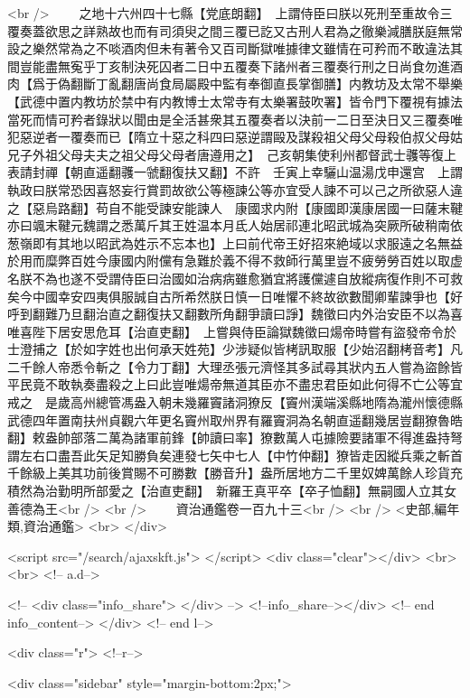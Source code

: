 <br />
　　之地十六州四十七縣【党底朗翻】　上謂侍臣曰朕以死刑至重故令三覆奏蓋欲思之詳熟故也而有司須臾之間三覆已訖又古刑人君為之徹樂減膳朕庭無常設之樂然常為之不啖酒肉但未有著令又百司斷獄唯據律文雖情在可矜而不敢違法其間豈能盡無寃乎丁亥制決死囚者二日中五覆奏下諸州者三覆奏行刑之日尚食勿進酒肉【爲于偽翻斷丁亂翻唐尚食局屬殿中監有奉御直長掌御膳】内教坊及太常不舉樂【武德中置内教坊於禁中有内教博士太常寺有太樂署鼓吹署】皆令門下覆視有據法當死而情可矜者錄狀以聞由是全活甚衆其五覆奏者以決前一二日至決日又三覆奏唯犯惡逆者一覆奏而已【隋立十惡之科四曰惡逆謂毆及謀殺祖父母父母殺伯叔父母姑兄子外祖父母夫夫之祖父母父母者唐遵用之】　己亥朝集使利州都督武士彠等復上表請封禪【朝直遥翻彠一虢翻復扶又翻】不許　壬寅上幸驪山温湯戊申還宫　上謂執政曰朕常恐因喜怒妄行賞罰故欲公等極諫公等亦宜受人諫不可以己之所欲惡人違之【惡烏路翻】苟自不能受諫安能諫人　康國求内附【康國即漢康居國一曰薩末鞬亦曰颯末鞬元魏謂之悉萬斤其王姓温本月氐人始居祁連北昭武城為突厥所破稍南依葱嶺即有其地以昭武為姓示不忘本也】上曰前代帝王好招來絶域以求服遠之名無益於用而糜弊百姓今康國内附儻有急難於義不得不救師行萬里豈不疲勞勞百姓以取虚名朕不為也遂不受謂侍臣曰治國如治病病雖愈猶宜將護儻遽自放縱病復作則不可救矣今中國幸安四夷俱服誠自古所希然朕日慎一日唯懼不終故欲數聞卿輩諫爭也【好呼到翻難乃旦翻治直之翻復扶又翻數所角翻爭讀曰諍】魏徵曰内外治安臣不以為喜唯喜陛下居安思危耳【治直吏翻】　上嘗與侍臣論獄魏徵曰煬帝時嘗有盜發帝令於士澄捕之【於如字姓也出何承天姓苑】少涉疑似皆栲訊取服【少始沼翻栲音考】凡二千餘人帝悉令斬之【令力丁翻】大理丞張元濟怪其多試尋其狀内五人嘗為盜餘皆平民竟不敢執奏盡殺之上曰此豈唯煬帝無道其臣亦不盡忠君臣如此何得不亡公等宜戒之　是歲高州總管馮盎入朝未幾羅竇諸洞獠反【竇州漢端溪縣地隋為瀧州懷德縣武德四年置南扶州貞觀六年更名竇州取州界有羅竇洞為名朝直遥翻幾居豈翻獠魯皓翻】敕盎帥部落二萬為諸軍前鋒【帥讀曰率】獠數萬人屯據險要諸軍不得進盎持弩謂左右口盡吾此矢足知勝負矣連發七矢中七人【中竹仲翻】獠皆走因縱兵乘之斬首千餘級上美其功前後賞賜不可勝數【勝音升】盎所居地方二千里奴婢萬餘人珍貨充積然為治勤明所部愛之【治直吏翻】　新羅王真平卒【卒子恤翻】無嗣國人立其女善德為王<br />
<br />
　　資治通鑑卷一百九十三<br />
<br />
<史部,編年類,資治通鑑>  <br>
   </div> 

<script src="/search/ajaxskft.js"> </script>
 <div class="clear"></div>
<br>
<br>
 <!-- a.d-->

 <!--
<div class="info_share">
</div> 
-->
 <!--info_share--></div>   <!-- end info_content-->
  </div> <!-- end l-->

<div class="r">   <!--r-->



<div class="sidebar"  style="margin-bottom:2px;">

